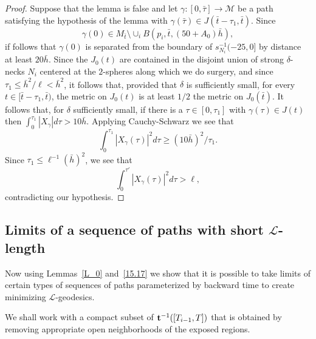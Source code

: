 \begin{proof}
Suppose that the lemma is false and let $\gamma\colon [0,\bar
\tau]\to {\mathcal M}$ be a path satisfying the hypothesis of the
lemma with $\gamma(\bar \tau)\in J(\bar t-\tau_1,\bar t)$.
 Since $$\gamma(0)\in
M_{\bar t}\setminus \cup_iB(p_i,\bar t,(50+A_0)\bar h),$$ if follows
that $\gamma(0)$ is separated from the boundary of
$s_{N_i}^{-1}(-25,0]$ by distance at least $20\bar h$. Since the $
J_0(t)$ are contained in the disjoint union of strong $\delta$-necks
$N_i$ centered at the $2$-spheres along which we do surgery, and
since $\tau_1\le \bar h^2/\ell<\bar h^2$, it follows that, provided
that $\delta$ is sufficiently small, for every $t\in [\bar
t-\tau_1,\bar t)$, the metric on $J_0(t)$ is at least
$1/2$ the metric on $ J_0(\bar t)$.
 It follows that, for $\delta$ sufficiently small, if there is a $\tau\in [0,\tau_1]$
with $\gamma(\tau)\in J(t)$ then $\int_0^{\tau_1}|X_\gamma|d\tau> 10\bar h$.
Applying Cauchy-Schwarz we see that
$$\int_0^{\tau_1}|X_\gamma(\tau)|^2d\tau\ge (10\bar h)^2/\tau_1.$$
Since $\tau_1\le \ell^{-1}(\bar h)^2$, we see that
$$\int_0^{\tau'}|X_\gamma(\tau)|^2d\tau>\ell,$$
contradicting our hypothesis.
\end{proof}


\subsection{Limits of a sequence of paths with short ${\mathcal L}$-length}


Now using Lemmas~\ref{L_0} and~\ref{15.17} we show that it is possible to take limits
of certain types of sequences of paths parameterized by backward time to create
minimizing ${\mathcal L}$-geodesics.

We shall work with a compact subset of ${\bf t}^{-1}([T_{i-1},T])$ that is
obtained by removing appropriate open neighborhoods of the exposed regions.

